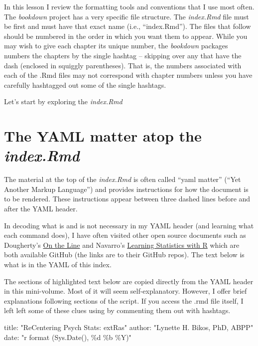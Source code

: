 \documentclass[
]{book}
\newenvironment{Shaded}{\begin{snugshade}}{\end{snugshade}}
\newcommand{\NormalTok}[1]{#1}
\newcommand{\SpecialCharTok}[1]{\textcolor[rgb]{0.00,0.00,0.00}{#1}}
\newcommand{\StringTok}[1]{\textcolor[rgb]{0.31,0.60,0.02}{#1}}
\begin{document}
In this lesson I review the formatting tools and conventions that I use most often. The \emph{bookdown} project has a very specific file structure. The \emph{index.Rmd} file must be first and must have that exact name (i.e., ``index.Rmd''). The files that follow should be numbered in the order in which you want them to appear. While you may wish to give each chapter its unique number, the \emph{bookdown} packages numbers the chapters by the single hashtag -- skipping over any that have the dash (enclosed in squiggly parentheses). That is, the numbers associated with each of the .Rmd files may not correspond with chapter numbers unless you have carefully hashtagged out some of the single hashtags.

Let's start by exploring the \emph{index.Rmd}

\hypertarget{the-yaml-matter-atop-the-index.rmd}{%
\section{\texorpdfstring{The YAML matter atop the \emph{index.Rmd}}{The YAML matter atop the index.Rmd}}\label{the-yaml-matter-atop-the-index.rmd}}

The material at the top of the \emph{index.Rmd} is often called ``yaml matter'' (``Yet Another Markup Language'') and provides instructions for how the document is to be rendered. These instructions appear between three dashed lines before and after the YAML header.

In decoding what is and is not necessary in my YAML header (and learning what each command does), I have often visited other open source documents such as Dougherty's \citeyearpar{dougherty_chapter_2021} \href{https://github.com/OnTheLine/otl-bookdown}{On the Line} and Navarro's \citeyearpar{navarro_book_2020} \href{https://github.com/djnavarro/rbook}{Learning Statistics with R} which are both available GitHub (the links are to their GitHub repos). The text below is what is in the YAML of this index.

The sections of highlighted text below are copied directly from the YAML header in this mini-volume. Most of it will seem self-explanatory. However, I offer brief explanations following sections of the script. If you access the .rmd file itself, I left left some of these clues using by commenting them out with hashtags.

\begin{Shaded}
\begin{Highlighting}[]
\NormalTok{title}\SpecialCharTok{:} \StringTok{"ReCentering Psych Stats: extRas"}
\NormalTok{author}\SpecialCharTok{:} \StringTok{"Lynette H. Bikos, PhD, ABPP"}
\NormalTok{date}\SpecialCharTok{:} \StringTok{"\textasciigrave{}r format (Sys.Date(), \textquotesingle{}\%d \%b \%Y\textquotesingle{})\textasciigrave{}"}
\end{Highlighting}
\end{Shaded}
\end{document}
